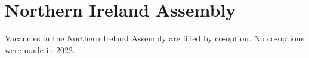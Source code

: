 \documentclass[a4paper,openany]{book}
\begin{document}
\section{Northern Ireland Assembly}

Vacancies in the Northern Ireland Assembly are filled by co-option.
No co-options were made in 2022.
%

%
%
\end{document}
